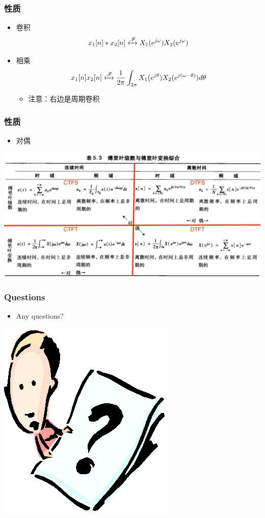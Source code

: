 \documentclass[CJKutf8,xcolor=pdftex,dvipsnames,table]{beamer}
\begin{document}
\begin{CJK*}{UTF8}{song}
  \begin{frame}
    \frametitle{性质}
    \begin{itemize}
    \item 卷积
    \[
    	x_1[n]*x_2[n] \xleftrightarrow{\mathscr{F}} X_1(e^{j\omega})X_2(e^{j\omega})
	\]    
    \item 相乘
    \[
    	x_1[n]x_2[n] \xleftrightarrow{\mathscr{F}} \frac{1}{2\pi}\int_{2\pi}X_1(e^{j\theta})X_2(e^{j(\omega-\theta)})d\theta
	\] 	
		\begin{itemize}
		\item 注意：右边是周期卷积
		\end{itemize}
	\end{itemize}
  \end{frame}   
	
  \begin{frame}
    \frametitle{性质}
    \begin{itemize}
    \item 对偶
    \end{itemize}
    \begin{center}
      \includegraphics[scale=.32]{ss-c-t5-3}
    \end{center}
  \end{frame}  
  	        
  \begin{frame}
    \frametitle{Questions}
    \begin{itemize}
    \item Any questions?
    \end{itemize}
    \begin{center}
      \includegraphics[scale=.5]{question}
    \end{center}
  \end{frame} 
  	        
\end{CJK*}
\end{document}
